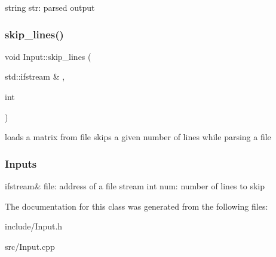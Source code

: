 string str\+: parsed output\mbox{\label{class_input_a1881bd785ffd830245fccb22091a53c0}} 
\subsubsection{\texorpdfstring{skip\_lines()}{skip\_lines()}}
{\footnotesize\ttfamily void Input\+::skip\+\_\+lines (\begin{DoxyParamCaption}\item[{std\+::ifstream \&}]{,  }\item[{int}]{ }\end{DoxyParamCaption})}

loads a matrix from file skips a given number of lines while parsing a file

\subsubsection*{Inputs }

ifstream\& file\+: address of a file stream int num\+: number of lines to skip

The documentation for this class was generated from the following files\+:\begin{DoxyCompactItemize}
\item 
include/Input.\+h\item 
src/Input.\+cpp\end{DoxyCompactItemize}
